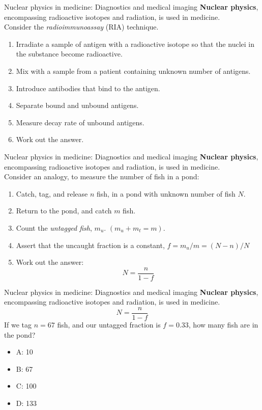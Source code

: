 \documentclass{beamer}
\begin{document}
\begin{frame}{Nuclear physics in medicine: Diagnostics and medical imaging}
\textbf{Nuclear physics}, encompassing radioactive isotopes and radiation, is used in medicine. \\ \vspace{0.5cm}
\small
Consider the \textit{radioimmunoassay} (RIA) technique.
\begin{enumerate}
\item Irradiate a sample of antigen with a radioactive isotope so that the nuclei in the substance become radioactive.
\item Mix with a sample from a patient containing unknown number of antigens.
\item Introduce antibodies that bind to the antigen.
\item Separate bound and unbound antigens.
\item Measure decay rate of unbound antigens.
\item Work out the answer.
\end{enumerate}
\end{frame}

\begin{frame}{Nuclear physics in medicine: Diagnostics and medical imaging}
\textbf{Nuclear physics}, encompassing radioactive isotopes and radiation, is used in medicine. \\ \vspace{0.5cm}
\small
Consider an analogy, to measure the number of fish in a pond:
\begin{enumerate}
\item Catch, tag, and release $n$ fish, in a pond with unknown number of fish $N$.
\item Return to the pond, and catch $m$ fish.
\item Count the \textit{untagged fish}, $m_u$.  $(m_u + m_t = m)$.
\item Assert that the uncaught fraction is a constant, $f = m_u/m = (N-n)/N$
\item Work out the answer:
\begin{equation}
N = \frac{n}{1-f}
\end{equation}
\end{enumerate}
\end{frame}

\begin{frame}{Nuclear physics in medicine: Diagnostics and medical imaging}
\textbf{Nuclear physics}, encompassing radioactive isotopes and radiation, is used in medicine. \\ \vspace{0.5cm}
\small
\begin{equation}
N = \frac{n}{1-f}
\end{equation}
If we tag $n = 67$ fish, and our untagged fraction is $f = 0.33$, how many fish are in the pond?
\begin{itemize}
\item A: 10
\item B: 67
\item C: 100
\item D: 133
\end{itemize}
\end{frame}
\end{document}
